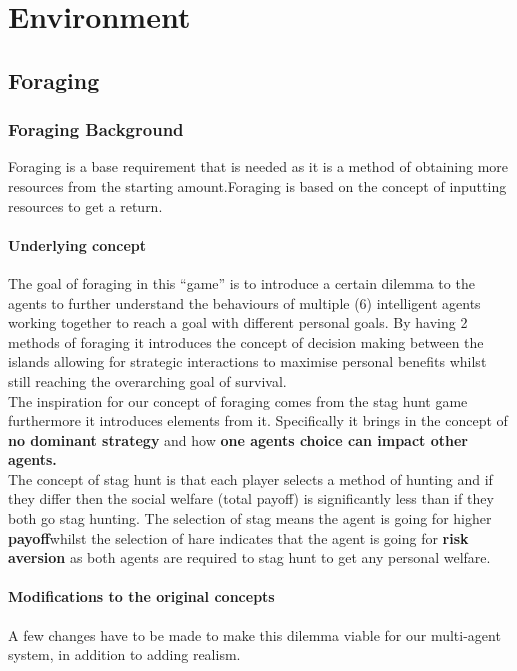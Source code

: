\chapter{Environment}
\section{Foraging}
\subsection{Foraging Background}

Foraging is a base requirement that is needed as it is a method of obtaining more resources from the starting amount.Foraging is based on the concept of inputting resources to get a return.\\

\subsubsection{Underlying concept}
The goal of foraging in this “game” is to introduce a certain dilemma to the agents to further understand the behaviours of multiple (6) intelligent agents working together to reach a goal with different personal goals. By having 2 methods of foraging it introduces the concept of decision making between the islands allowing for strategic interactions to maximise personal benefits whilst still reaching the overarching goal of survival.\\  

The inspiration for our concept of foraging comes from the stag hunt game furthermore it introduces elements from it. Specifically it brings in the concept of \textbf{no dominant strategy} and how \textbf{ one agents choice can impact other agents.}\\

The concept of stag hunt is that each player selects a method of hunting and if they differ then the social welfare (total payoff) is significantly less than if they both go stag hunting. The selection of stag means the agent is going for higher \textbf{payoff}whilst the selection of hare indicates that the agent is going for \textbf{risk aversion} as both agents are required to stag hunt to get any personal welfare. \\

\subsubsection{Modifications to the original concepts} 
A few changes have to be made to make this dilemma viable for our multi-agent system, in addition to adding realism. 

